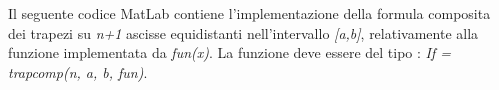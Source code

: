 Il seguente codice MatLab contiene l'implementazione della formula composita dei trapezi su \textit{n+1} ascisse equidistanti nell'intervallo \textit{[a,b]}, relativamente alla funzione implementata da \textit{fun(x)}. La funzione deve essere del tipo : \textit{If = trapcomp(n, a, b, fun)}.\\\
